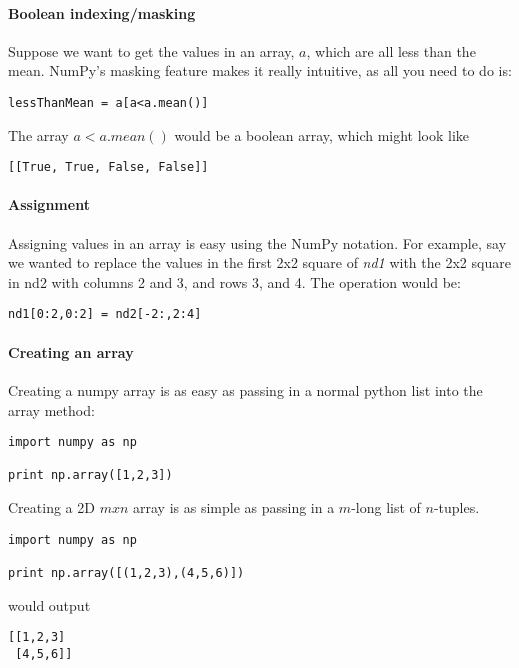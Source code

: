 \paragraph{Boolean indexing/masking} Suppose we want to get the values in an array, $a$, which are all less than the mean. NumPy's masking feature makes it really intuitive, as all you need to do is:

\begin{lstlisting}[style=python]
lessThanMean = a[a<a.mean()]
\end{lstlisting}

\noindent The array $a < a.mean()$ would be a boolean array, which might look like
\begin{lstlisting}[style=python]
[[True, True, False, False]]
\end{lstlisting}

\paragraph{Assignment} Assigning values in an array is easy using the NumPy notation. For example, say we wanted to replace the values in the first 2x2 square of \textit{nd1} with the 2x2 square in nd2 with columns 2 and 3, and rows 3, and 4. The operation would be:

\begin{lstlisting}[style=python]
nd1[0:2,0:2] = nd2[-2:,2:4]
\end{lstlisting}

\paragraph{Creating an array} Creating a numpy array is as easy as passing in a normal python list into the array method:

\begin{lstlisting}[style=python]
import numpy as np

print np.array([1,2,3])
\end{lstlisting}

\noindent Creating a 2D $mxn$ array is as simple as passing in a $m$-long list of $n$-tuples.

\begin{lstlisting}[style=python]
import numpy as np

print np.array([(1,2,3),(4,5,6)])
\end{lstlisting}

\noindent would output

\begin{lstlisting}[style=python]
[[1,2,3]
 [4,5,6]]
\end{lstlisting}

